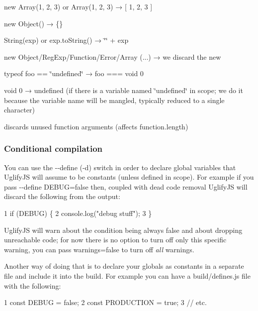 \begin{DoxyItemize}
\item {\ttfamily new Array(1, 2, 3)} or {\ttfamily Array(1, 2, 3)} → {\ttfamily \mbox{[} 1, 2, 3 \mbox{]}}
\item {\ttfamily new Object()} → {\ttfamily \{\}}
\item {\ttfamily String(exp)} or {\ttfamily exp.\+to\+String()} → {\ttfamily \char`\"{}\char`\"{} + exp}
\item {\ttfamily new Object/\+Reg\+Exp/\+Function/\+Error/\+Array (...)} → we discard the {\ttfamily new}
\item {\ttfamily typeof foo == \char`\"{}undefined\char`\"{}} → {\ttfamily foo === void 0}
\item {\ttfamily void 0} → {\ttfamily undefined} (if there is a variable named \char`\"{}undefined\char`\"{} in scope; we do it because the variable name will be mangled, typically reduced to a single character)
\item discards unused function arguments (affects {\ttfamily function.\+length})
\end{DoxyItemize}

\subsubsection*{Conditional compilation}

You can use the {\ttfamily -\/-\/define} ({\ttfamily -\/d}) switch in order to declare global variables that Uglify\+J\+S will assume to be constants (unless defined in scope). For example if you pass {\ttfamily -\/-\/define D\+E\+B\+U\+G=false} then, coupled with dead code removal Uglify\+J\+S will discard the following from the output\+: 
\begin{DoxyCode}
1 if (DEBUG) \{
2     console.log("debug stuff");
3 \}
\end{DoxyCode}


Uglify\+J\+S will warn about the condition being always false and about dropping unreachable code; for now there is no option to turn off only this specific warning, you can pass {\ttfamily warnings=false} to turn off {\itshape all} warnings.

Another way of doing that is to declare your globals as constants in a separate file and include it into the build. For example you can have a {\ttfamily build/defines.\+js} file with the following\+: 
\begin{DoxyCode}
1 const DEBUG = false;
2 const PRODUCTION = true;
3 // etc.
\end{DoxyCode}


